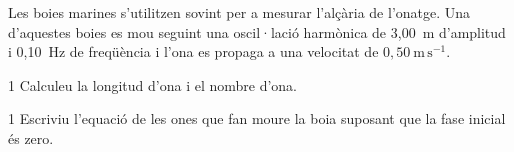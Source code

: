 Les boies marines s'utilitzen sovint per a mesurar l'alçària de l'onatge. Una d'aquestes boies es mou seguint una oscil·lació harmònica de 3,00~m d'amplitud i 0,10~Hz de freqüència i l'ona es propaga a una velocitat de $0,50\ \mathrm{m\,s^{-1}}$.

\begin{apartat}{1}
Calculeu la longitud d'ona i el nombre d'ona.
\end{apartat}

\begin{apartat}{1}
Escriviu l'equació de les ones que fan moure la boia suposant que la fase inicial és zero.
\end{apartat}
